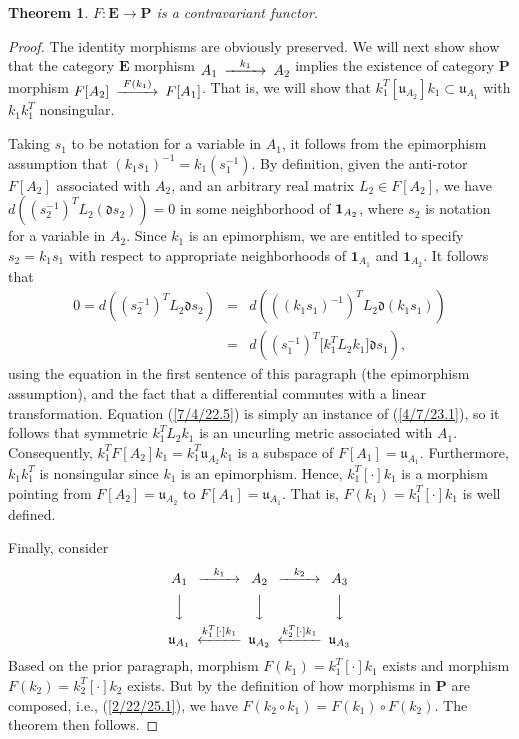\documentclass{amsart}
\numberwithin{equation}{section}
\newtheorem{theorem}{Theorem}
\theoremstyle{definition}
\numberwithin{theorem}{section}
\begin{document}
\begin{theorem}\label{6/13/22.1}  $F: \mathbf{E}\rightarrow \mathbf{P}$ is a contravariant functor. 
 \end{theorem}
 \begin{proof}  The identity morphisms are obviously preserved.
We will next show show that the category $\mathbf{E}$ morphism $ \begin{CD}  A_1 @>k_1>> A_2\end{CD}$ implies the existence of category {\bf P} morphism $ \begin{CD}  F[A_2] @>F(k_1)>> F[A_1]\end{CD}$.  That is, we will show that $k_1^T[\mathfrak{u}_{A_2}]k_1 \subset \mathfrak{u}_{A_1}$ with $k_1k_1^T$ nonsingular.

 Taking $s_1$ to be notation for a variable in $A_1$, it follows from the epimorphism assumption that $(k_1s_1)^{-1} = k_1(s_1^{-1})$.  By definition, given the anti-rotor $F[A_2]$ associated with $A_2$, and an arbitrary real matrix  $L_2 \in F[A_2]$, we have $d\left((s_2^{-1})^TL_2 (\mathfrak{d}s_2)\right) = 0$ in some neighborhood of ${\bf 1}_{A_2}$, where $s_2$ is notation for a variable in $A_2$.  Since $k_1$ is an epimorphism, we are entitled to specify $s_2=k_1 s_1$ with respect to appropriate neighborhoods of $\mathbf{1}_{A_1}$ and $\mathbf{1}_{A_2}$.   It follows that \begin{eqnarray}\nonumber 0 = d\left((s_2^{-1})^TL_2 \mathfrak{d}s_2\right) &=&  d\left(((k_1s_1)^{-1})^TL_2 \mathfrak{d}(k_1s_1)\right) \\  &=& d\left((s_1^{-1})^T \big[k_1^T L_2k_1\big]\mathfrak{d}s_1\right), \label{7/4/22.5}  \end{eqnarray}   using the equation in the first sentence of this paragraph (the epimorphism assumption), and the fact that a differential commutes with a linear transformation.  Equation (\ref{7/4/22.5}) is simply an instance of (\ref{4/7/23.1}), so it follows that symmetric $k_1^T L_2k_1$ is an uncurling metric associated with $A_1$.  
 Consequently, $k_1^TF[A_2]k_1 = k_1^T\mathfrak{u}_{A_2}k_1$ is a subspace of $F[A_1] = \mathfrak{u}_{A_1}$.  Furthermore, $k_1k_1^T$ is nonsingular since $k_1$ is an epimorphism.  Hence, $k_1^T[\cdot]k_1$ is a morphism pointing from $F[A_2]= \mathfrak{u}_{A_2}$ to $F[A_1]=\mathfrak{u}_{A_1}$.  That is, $F(k_1)=k_1^T[\cdot]k_1$ is well defined.

Finally, consider
      \[  \begin{CD}  
A_1 @>k_1>> A_2 @>k_2>> A_3\\
 @VVV   @VVV  @VVV\\
\mathfrak{u}_{A_1}   @<k_1^T[\cdot]k_1<<  \mathfrak{u}_{A_2}  @<k_2^T[\cdot]k_1<<  \mathfrak{u}_{A_3} \\ 
 \end{CD} \]
Based on the prior paragraph, morphism $F(k_1) = k_1^T[\cdot]k_1$ exists and morphism $F(k_2) = k_2^T[\cdot]k_2$ exists.  But by the definition of how morphisms in $\mathbf{P}$ are composed, i.e., (\ref{2/22/25.1}), we have $ F(k_2\circ k_1) = F(k_1)\circ F(k_2)$.   The theorem then follows.
\end{proof}
\end{document}
